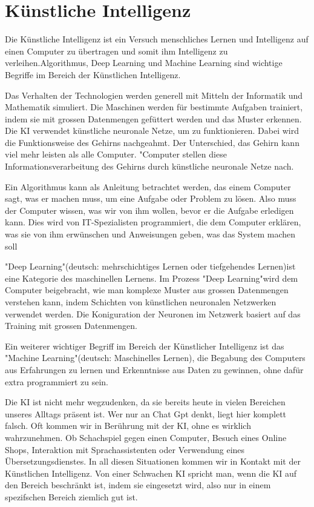 \section{Künstliche Intelligenz}
\label{sec:ai}

Die Künstliche Intelligenz ist ein Versuch menschliches Lernen und Intelligenz auf einen Computer zu übertragen und somit ihm Intelligenz zu verleihen.Algorithmus, Deep Learning und Machine Learning sind wichtige Begriffe im Bereich der Künstlichen Intelligenz. 

Das Verhalten der Technologien werden generell mit Mitteln der Informatik und Mathematik simuliert. Die Maschinen werden für bestimmte Aufgaben trainiert, indem sie mit grossen Datenmengen gefüttert werden und das Muster erkennen. Die KI verwendet künstliche neuronale Netze, um zu funktionieren. Dabei wird die Funktionsweise des Gehirns nachgeahmt. Der Unterschied, das Gehirn kann viel mehr leisten als alle Computer. "Computer stellen diese Informationsverarbeitung des Gehirns durch künstliche neuronale Netze nach.

Ein Algorithmus kann als Anleitung betrachtet werden, das einem Computer sagt, was er machen muss, um eine Aufgabe oder Problem zu lösen. Also muss der Computer wissen, was wir von ihm wollen, bevor er die Aufgabe erledigen kann. Dies wird von IT-Spezialisten programmiert, die dem Computer erklären, was sie von ihm erwünschen und Anweisungen geben, was das System machen soll

"Deep Learning"(deutsch: mehrschichtiges Lernen oder tiefgehendes Lernen)ist eine Kategorie des maschinellen Lernens. Im Prozess "Deep Learning"wird dem Computer beigebracht, wie man komplexe Muster aus grossen Datenmengen verstehen kann, indem Schichten von künstlichen neuronalen Netzwerken verwendet werden. Die Koniguration der Neuronen im Netzwerk basiert auf das Training mit grossen Datenmengen.

Ein weiterer wichtiger Begriff im Bereich der Künstlicher Intelligenz ist das "Machine Learning"(deutsch: Maschinelles Lernen), die Begabung des Computers aus Erfahrungen zu lernen und Erkenntnisse aus Daten zu gewinnen, ohne dafür extra programmiert zu sein.

Die KI ist nicht mehr wegzudenken, da sie bereits heute in vielen Bereichen unseres Alltags präsent ist. Wer nur an Chat Gpt denkt, liegt hier komplett falsch. Oft kommen wir in Berührung mit der KI, ohne es wirklich wahrzunehmen. Ob Schachspiel gegen einen Computer, Besuch eines Online Shops, Interaktion mit Sprachassistenten oder Verwendung eines Übersetzungsdienstes. In all diesen Situationen kommen wir in Kontakt mit der Künstlichen Intelligenz. Von einer Schwachen KI spricht man, wenn die KI auf den Bereich beschränkt ist, indem sie eingesetzt wird, also nur in einem spezifschen Bereich ziemlich gut ist.



